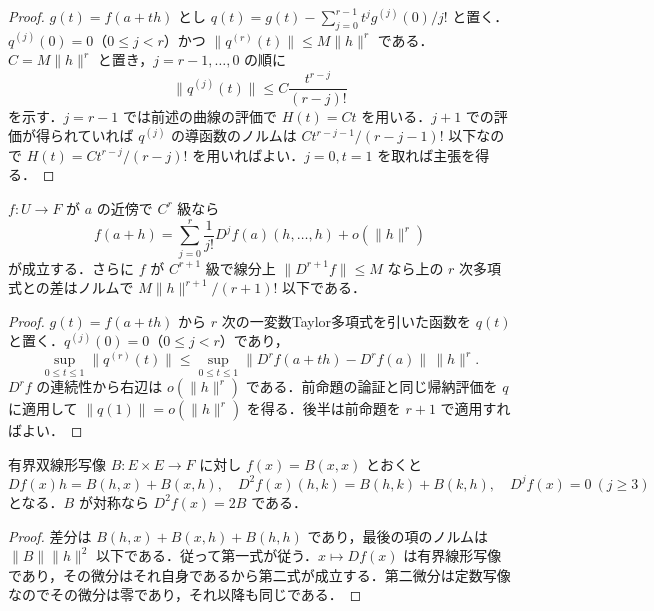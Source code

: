 \begin{proof}
$g(t)=f(a+th)$ とし $q(t)=g(t)-\sum_{j=0}^{r-1}t^jg^{(j)}(0)/j!$ と置く．$q^{(j)}(0)=0$（$0\leq j<r$）かつ $\|q^{(r)}(t)\|\leq M\|h\|^r$ である．$C=M\|h\|^r$ と置き，$j=r-1,\ldots,0$ の順に
\[
\|q^{(j)}(t)\|\leq C\frac{t^{r-j}}{(r-j)!}
\]
を示す．$j=r-1$ では前述の曲線の評価で $H(t)=Ct$ を用いる．$j+1$ での評価が得られていれば $q^{(j)}$ の導函数のノルムは $Ct^{r-j-1}/(r-j-1)!$ 以下なので $H(t)=Ct^{r-j}/(r-j)!$ を用いればよい．$j=0,t=1$ を取れば主張を得る．
\end{proof}
\begin{prop}[高階Fréchet微分によるTaylor公式]
$f:U\to F$ が $a$ の近傍で $C^r$ 級なら
\[
f(a+h)=\sum_{j=0}^r\frac1{j!}D^jf(a)(h,\ldots,h)+o(\|h\|^r)
\]
が成立する．さらに $f$ が $C^{r+1}$ 級で線分上 $\|D^{r+1}f\|\leq M$ なら上の $r$ 次多項式との差はノルムで $M\|h\|^{r+1}/(r+1)!$ 以下である．
\end{prop}
\begin{proof}
$g(t)=f(a+th)$ から $r$ 次の一変数Taylor多項式を引いた函数を $q(t)$ と置く．$q^{(j)}(0)=0$（$0\leq j<r$）であり，
\[
\sup_{0\leq t\leq1}\|q^{(r)}(t)\|\leq\sup_{0\leq t\leq1}\|D^rf(a+th)-D^rf(a)\|\,\|h\|^r.
\]
$D^rf$ の連続性から右辺は $o(\|h\|^r)$ である．前命題の論証と同じ帰納評価を $q$ に適用して $\|q(1)\|=o(\|h\|^r)$ を得る．後半は前命題を $r+1$ で適用すればよい．
\end{proof}
\begin{example}[二次多項式の高階微分]
有界双線形写像 $B:E\times E\to F$ に対し $f(x)=B(x,x)$ とおくと
\[
Df(x)h=B(h,x)+B(x,h),\quad D^2f(x)(h,k)=B(h,k)+B(k,h),\quad D^jf(x)=0\ (j\geq3)
\]
となる．$B$ が対称なら $D^2f(x)=2B$ である．
\end{example}
\begin{proof}
差分は $B(h,x)+B(x,h)+B(h,h)$ であり，最後の項のノルムは $\|B\|\|h\|^2$ 以下である．従って第一式が従う．$x\mapsto Df(x)$ は有界線形写像であり，その微分はそれ自身であるから第二式が成立する．第二微分は定数写像なのでその微分は零であり，それ以降も同じである．
\end{proof}
